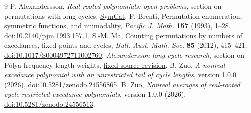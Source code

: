 \documentclass[11pt]{article}
\begin{document}
\begin{thebibliography}{9}
 P. Alexandersson, \emph{Real-rooted polynomials: open problems}, section on permutations with long cycles, \href{https://www.symmetricfunctions.com/realRootedOpenProblems.htm\#permutations-with-long-cycles}{SymCat}.
 F. Brenti, Permutation enumeration, symmetric functions, and unimodality, \emph{Pacific J. Math.} \textbf{157} (1993), 1--28. \href{https://doi.org/10.2140/pjm.1993.157.1}{doi:10.2140/pjm.1993.157.1}.
 S.-M. Ma, Counting permutations by numbers of excedances, fixed points and cycles, \emph{Bull. Aust. Math. Soc.} \textbf{85} (2012), 415--421. \href{https://doi.org/10.1017/S0004972711002760}{doi:10.1017/S0004972711002760}.
 \emph{Alexandersson long-cycle research}, section on P\'olya-frequency length weights, \href{https://github.com/1337isnot1337/solved-conjectures/blob/0c07434ef991b853528ca55926b3b83820b7f58d/docs/alexandersson-long-cycle-research.md}{fixed source revision}.
 B. Zuo, \emph{A nonreal excedance polynomial with an unrestricted tail of cycle lengths}, version 1.0.0 (2026), \href{https://doi.org/10.5281/zenodo.24556865}{doi:10.5281/zenodo.24556865}.
 B. Zuo, \emph{Nonreal averages of real-rooted cycle-restricted excedance polynomials}, version 1.0.0 (2026), \href{https://doi.org/10.5281/zenodo.24556513}{doi:10.5281/zenodo.24556513}.
\end{thebibliography}
\end{document}
